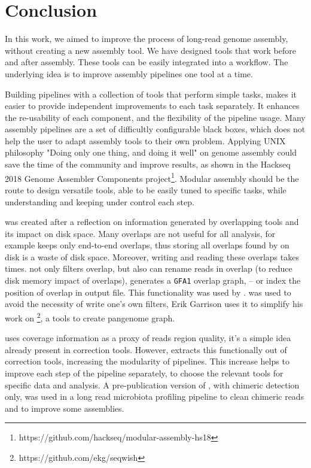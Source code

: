 \documentclass[main.tex]{subfiles}
\begin{document}
\chapter{Conclusion}

In this work, we aimed to improve the process of long-read genome assembly, without creating a new assembly tool. We have designed tools that work before and after assembly. These tools can be easily integrated into a workflow. The underlying idea is to improve assembly pipelines one tool at a time.

Building pipelines with a collection of tools that perform simple tasks, makes it easier to provide independent improvements to each task separately. It enhances the re-usability of each component, and the flexibility of the pipeline usage. Many assembly pipelines are a set of difficultly configurable black boxes, which does not help the user to adapt assembly tools to their own problem. Applying UNIX philosophy "Doing only one thing, and doing it well" on genome assembly could save the time of the community and improve results, as shown in the Hackseq 2018 Genome Assembler Components project\footnote{https://github.com/hackseq/modular-assembly-hs18}. Modular assembly should be the route to design versatile tools, able to be easily tuned to specific tasks, while understanding and keeping under control each step.

\fpa was created after a reflection on information generated by overlapping tools and its impact on disk space. Many overlaps are not useful for all analysis, for example \miniasm keeps only end-to-end overlaps, thus storing all overlaps found by \minimap on disk is a waste of disk space. Moreover, writing and reading these overlaps takes times. \fpa not only filters overlap, but also can rename reads in overlap (to reduce disk memory impact of overlaps), generates a \texttt{GFA1} overlap graph, -- or index the position of overlap in output file. This functionality was used by \consent \cite{CONSENT}. \fpa was used to avoid the necessity of write one's own filters, Erik Garrison uses it to simplify his work on \footnote{https://github.com/ekg/seqwish}, a tools to create pangenome graph.

\yacrd uses coverage information as a proxy of reads region quality, it's a simple idea already present in correction tools. However, \yacrd extracts this functionally out of correction tools, increasing the modularity of pipelines. This increase helps to improve each step of the pipeline separately, to choose the relevant tools for specific data and analysis. A pre-publication version of \yacrd, with chimeric detection only, was used in a long read microbiota profiling pipeline to clean chimeric reads \cite{cite_yacrd} and to improve some \flye assemblies. 
\end{document}
